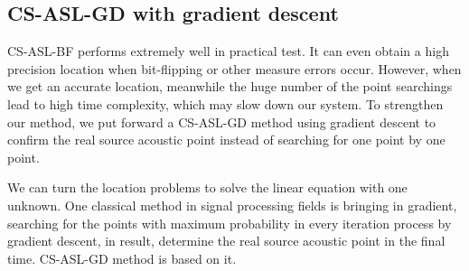 \subsection{CS-ASL-GD with gradient descent}
CS-ASL-BF performs extremely well in practical test. It can even obtain a high precision location when bit-flipping or other measure errors occur.
However, when we get an accurate location, meanwhile the huge number of the point searchings lead to high time complexity, which may slow down our system. To strengthen our method, we put forward a CS-ASL-GD method using gradient descent to confirm the real source acoustic point instead of searching for one point by one point.

We can turn the location problems to solve the linear equation with one unknown. One classical method in signal processing fields is bringing in gradient, searching for the points with maximum probability in every iteration process by gradient descent, in result, determine the real source acoustic point in the final time. CS-ASL-GD method is based on it.

